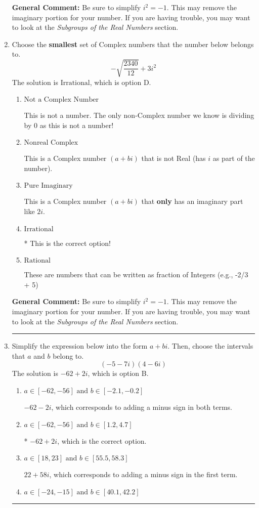 \documentclass{extbook}[14pt]
\newcommand{\litem}[1]{\item #1

\rule{\textwidth}{0.4pt}}
\begin{document}
\begin{enumerate}
{\textbf{General Comment:} Be sure to simplify $i^2 = -1$. This may remove the imaginary portion for your number. If you are having trouble, you may want to look at the \textit{Subgroups of the Real Numbers} section.
}
\litem{
Choose the \textbf{smallest} set of Complex numbers that the number below belongs to.
\[ -\sqrt{\frac{2340}{12}}+3i^2 \]
The solution is \( \text{Irrational} \), which is option D.\begin{enumerate}[label=\Alph*.]
\item \( \text{Not a Complex Number} \)

This is not a number. The only non-Complex number we know is dividing by 0 as this is not a number!
\item \( \text{Nonreal Complex} \)

This is a Complex number $(a+bi)$ that is not Real (has $i$ as part of the number).
\item \( \text{Pure Imaginary} \)

This is a Complex number $(a+bi)$ that \textbf{only} has an imaginary part like $2i$.
\item \( \text{Irrational} \)

* This is the correct option!
\item \( \text{Rational} \)

These are numbers that can be written as fraction of Integers (e.g., -2/3 + 5)
\end{enumerate}

\textbf{General Comment:} Be sure to simplify $i^2 = -1$. This may remove the imaginary portion for your number. If you are having trouble, you may want to look at the \textit{Subgroups of the Real Numbers} section.
}
\litem{
Simplify the expression below into the form $a+bi$. Then, choose the intervals that $a$ and $b$ belong to.
\[ (-5 - 7 i)(4 - 6 i) \]
The solution is \( -62 + 2 i \), which is option B.\begin{enumerate}[label=\Alph*.]
\item \( a \in [-62, -56] \text{ and } b \in [-2.1, -0.2] \)

 $-62 - 2 i$, which corresponds to adding a minus sign in both terms.
\item \( a \in [-62, -56] \text{ and } b \in [1.2, 4.7] \)

* $-62 + 2 i$, which is the correct option.
\item \( a \in [18, 23] \text{ and } b \in [55.5, 58.3] \)

 $22 + 58 i$, which corresponds to adding a minus sign in the first term.
\item \( a \in [-24, -15] \text{ and } b \in [40.1, 42.2] \)


\end{enumerate}}
\end{enumerate}
\end{document}
